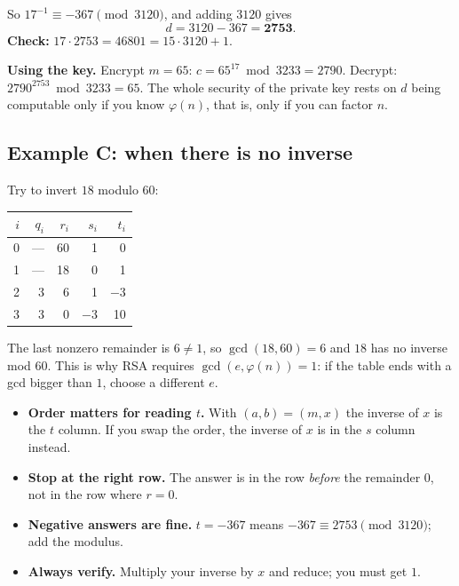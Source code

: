 \documentclass[11pt]{article}
\newcommand{\hl}{\rowcolor{green!15}}
\begin{document}
So $17^{-1}\equiv-367\pmod{3120}$, and adding $3120$ gives
\[
d=3120-367=\mathbf{2753}.
\]
\textbf{Check:} $17\cdot2753=46801=15\cdot3120+1$. \checkmark

\textbf{Using the key.} Encrypt $m=65$: $c=65^{17}\bmod3233=2790$. Decrypt: $2790^{2753}\bmod3233=65$. The whole security of the private key rests on $d$ being computable only if you know $\varphi(n)$, that is, only if you can factor $n$.

\subsection*{Example C: when there is no inverse}
Try to invert $18$ modulo $60$:
\begin{center}
\renewcommand{\arraystretch}{1.2}
\begin{tabular}{@{}rrrrr@{}}
\toprule
$i$ & $q_i$ & $r_i$ & $s_i$ & $t_i$ \\
\midrule
0 & --- & 60 & 1 & 0 \\
1 & --- & 18 & 0 & 1 \\
\hl 2 & 3 & 6 & 1 & $-3$ \\
3 & 3 & 0 & $-3$ & 10 \\
\bottomrule
\end{tabular}
\end{center}
The last nonzero remainder is $6\ne1$, so $\gcd(18,60)=6$ and $18$ has no inverse mod $60$. This is why RSA requires $\gcd(e,\varphi(n))=1$: if the table ends with a gcd bigger than $1$, choose a different $e$.

\begin{warn}
\begin{itemize}[nosep]
\item \textbf{Order matters for reading $t$.} With $(a,b)=(m,x)$ the inverse of $x$ is the $t$ column. If you swap the order, the inverse of $x$ is in the $s$ column instead.
\item \textbf{Stop at the right row.} The answer is in the row \emph{before} the remainder $0$, not in the row where $r=0$.
\item \textbf{Negative answers are fine.} $t=-367$ means $-367\equiv2753 \pmod{3120}$; add the modulus.
\item \textbf{Always verify.} Multiply your inverse by $x$ and reduce; you must get $1$.
\end{itemize}
\end{warn}

\hrulefill

\end{document}
